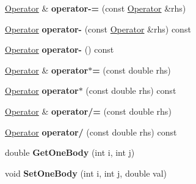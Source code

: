 \begin{DoxyCompactItemize}
\item 
\hypertarget{classOperator_a1235ee7e0ba5220a831ac0c01b2210b9}{\hyperlink{classOperator}{Operator} \& {\bfseries operator-\/=} (const \hyperlink{classOperator}{Operator} \&rhs)}\label{classOperator_a1235ee7e0ba5220a831ac0c01b2210b9}

\item 
\hypertarget{classOperator_ac25a9769a621623062b922cb9a40a489}{\hyperlink{classOperator}{Operator} {\bfseries operator-\/} (const \hyperlink{classOperator}{Operator} \&rhs) const }\label{classOperator_ac25a9769a621623062b922cb9a40a489}

\item 
\hypertarget{classOperator_aa06ee3d5828d7bc43b3aca693ac0ef25}{\hyperlink{classOperator}{Operator} {\bfseries operator-\/} () const }\label{classOperator_aa06ee3d5828d7bc43b3aca693ac0ef25}

\item 
\hypertarget{classOperator_a9398ce826d8ef57e69a1aa776734080f}{\hyperlink{classOperator}{Operator} \& {\bfseries operator$\ast$=} (const double rhs)}\label{classOperator_a9398ce826d8ef57e69a1aa776734080f}

\item 
\hypertarget{classOperator_a0eeafc807e6ef6e3d30810f114e249bb}{\hyperlink{classOperator}{Operator} {\bfseries operator$\ast$} (const double rhs) const }\label{classOperator_a0eeafc807e6ef6e3d30810f114e249bb}

\item 
\hypertarget{classOperator_a53af250702ec7c48de5397b209ebc09e}{\hyperlink{classOperator}{Operator} \& {\bfseries operator/=} (const double rhs)}\label{classOperator_a53af250702ec7c48de5397b209ebc09e}

\item 
\hypertarget{classOperator_a60c6e3fa8da186a1183e540e6ff04421}{\hyperlink{classOperator}{Operator} {\bfseries operator/} (const double rhs) const }\label{classOperator_a60c6e3fa8da186a1183e540e6ff04421}

\item 
\hypertarget{classOperator_a34eb5fa0e6d415cd44e1a3034d1cf5c0}{double {\bfseries Get\-One\-Body} (int i, int j)}\label{classOperator_a34eb5fa0e6d415cd44e1a3034d1cf5c0}

\item 
\hypertarget{classOperator_ae85aa3d8fdaeb3cb6266c3a4494e904b}{void {\bfseries Set\-One\-Body} (int i, int j, double val)}\label{classOperator_ae85aa3d8fdaeb3cb6266c3a4494e904b}


\end{DoxyCompactItemize}
